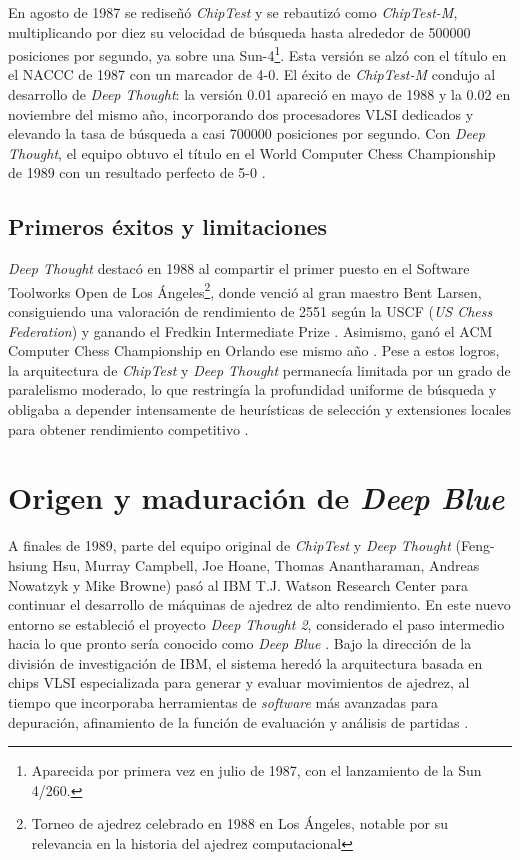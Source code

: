 \documentclass[a4paper, 12pt]{article}
\begin{document}
En agosto de 1987 se rediseñó \emph{ChipTest} y se rebautizó como 
\emph{ChipTest-M}, multiplicando por diez su velocidad de búsqueda 
hasta alrededor de 500000 posiciones por segundo, ya sobre una 
Sun-4\footnote{Aparecida por primera vez en julio de 1987, con el lanzamiento de la Sun 4/260.}. 
Esta versión se alzó con el título en el 
NACCC de 1987 con un marcador de 4-0. El éxito de 
\emph{ChipTest-M} condujo al desarrollo de \emph{Deep Thought}: la versión 
0.01 apareció en mayo de 1988 y la 0.02 en noviembre del mismo 
año, incorporando dos procesadores VLSI dedicados y elevando la 
tasa de búsqueda a casi 700000 posiciones por segundo. Con \emph{Deep Thought}, el equipo obtuvo el título en 
el World Computer Chess Championship de 1989 con un resultado 
perfecto de 5-0 \cite{newborn1988results}.

\subsection{Primeros éxitos y limitaciones}

\emph{Deep Thought} destacó en 1988 al compartir el primer puesto en el 
Software Toolworks Open de Los Ángeles\footnote{Torneo de ajedrez celebrado en 1988 en Los Ángeles, notable por su relevancia en la historia del ajedrez computacional}, 
donde venció al gran 
maestro Bent Larsen, consiguiendo una valoración de rendimiento 
de 2551 según la USCF (\emph{US Chess Federation}) y ganando 
el Fredkin Intermediate Prize \cite{hsu1990grandmaster}. 
Asimismo, ganó el ACM Computer Chess 
Championship en Orlando ese mismo año \cite{hsu1990grandmaster}. Pese a 
estos logros, la arquitectura de \emph{ChipTest} y \emph{Deep Thought} 
permanecía limitada por un grado de paralelismo moderado, 
lo que restringía la profundidad uniforme de 
búsqueda y obligaba a depender intensamente de heurísticas de 
selección y extensiones locales para obtener rendimiento 
competitivo \cite{hsu1990deep}.








\section{Origen y maduración de \textit{Deep Blue}}

A finales de 1989, parte del equipo original de \emph{ChipTest} y \emph{Deep 
Thought} (Feng-hsiung Hsu, Murray Campbell, Joe Hoane, Thomas Anantharaman, 
Andreas Nowatzyk y Mike Browne) pasó al IBM T.J. 
Watson Research Center para continuar el desarrollo de máquinas 
de ajedrez de alto rendimiento. En este nuevo entorno se 
estableció el proyecto \textit{\emph{Deep Thought} 2}, considerado el 
paso intermedio hacia lo que pronto sería conocido como 
\textit{Deep Blue} \cite{campbell2002deep}. Bajo la dirección de la 
división de investigación de IBM, el sistema heredó la 
arquitectura basada en chips VLSI especializada para generar y 
evaluar movimientos de ajedrez, al tiempo que incorporaba 
herramientas de \emph{software} más avanzadas para depuración, 
afinamiento de la función de evaluación y análisis de partidas 
\cite{campbell2002deep}.
\end{document}
